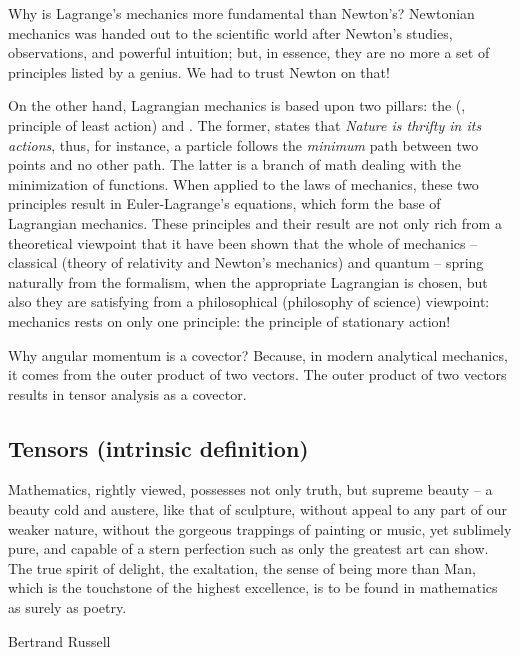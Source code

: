 \begin{note}
  Why is Lagrange's mechanics more fundamental than Newton's? Newtonian mechanics was handed out to the scientific world after Newton's studies, observations, and powerful intuition; but, in essence, they are no more a set of principles listed by a genius. We had to trust Newton on that!
  
  On the other hand, Lagrangian mechanics is based upon two pillars: the  (\aka, principle of least action) and . The former, states that \emph{Nature is thrifty in its actions}, thus, for instance, a particle follows the \emph{minimum} path between two points and no other path. The latter is a branch of math dealing with the minimization of functions. When applied to the laws of mechanics, these two principles result in Euler-Lagrange's equations, which form the base of Lagrangian mechanics. These principles and their result are not only rich from a theoretical viewpoint that it have been shown that the whole of mechanics -- classical (theory of relativity and Newton's mechanics) and quantum -- spring naturally from the formalism, when the appropriate Lagrangian is chosen, but also they are satisfying from a philosophical (philosophy of science) viewpoint: mechanics rests on only one principle: the principle of stationary action!
\end{note}

\begin{note}
  Why angular momentum is a covector? Because, in modern analytical mechanics, it comes from the outer product of two vectors. The outer product of two vectors results in tensor analysis as a covector.
\end{note}


\subsection{Tensors (intrinsic definition)}

\epigraph{Mathematics, rightly viewed, possesses not only truth, but supreme beauty -- a beauty cold and austere, like that of sculpture, without appeal to any part of our weaker nature, without the gorgeous trappings of painting or music, yet sublimely pure, and capable of a stern perfection such as only the greatest art can show. The true spirit of delight, the exaltation, the sense of being more than Man, which is the touchstone of the highest excellence, is to be found in mathematics as surely as poetry.}{Bertrand Russell}

